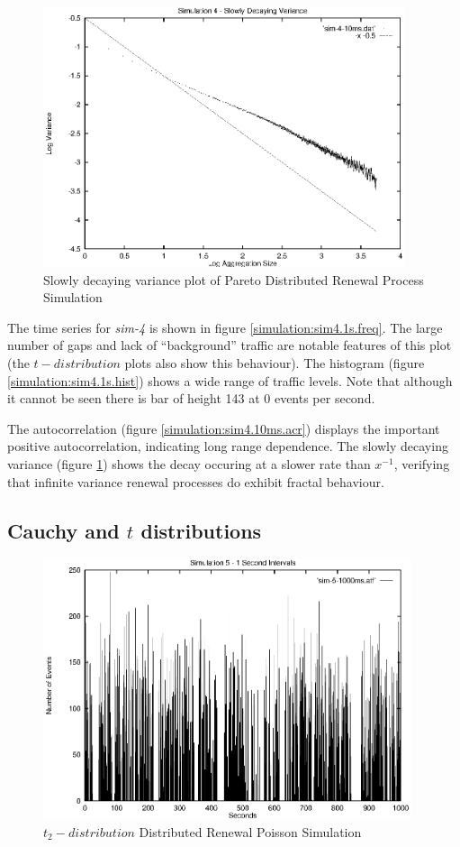 \begin{figure}
\includegraphics[height=3in]{pics/sim-4-10ms-sta.eps}
\caption{Slowly decaying variance plot of Pareto Distributed Renewal Process Simulation}
\label{simulation:sim4.10ms.sta}
\end{figure}

The time series for \emph{sim-4} is shown in figure
\ref{simulation:sim4.1s.freq}.  The large number of gaps and lack of
``background'' traffic are notable features of this plot (the
$t-distribution$ plots also show this behaviour).  The histogram
(figure \ref{simulation:sim4.1s.hist}) shows a wide range of traffic
levels.  Note that although it cannot be seen there is bar of height
143 at 0 events per second.

The autocorrelation (figure \ref{simulation:sim4.10ms.acr}) displays
the important positive autocorrelation, indicating long range
dependence.  The slowly decaying variance (figure
\ref{simulation:sim4.10ms.sta}) shows the decay occuring at a slower
rate than $x^{-1}$, verifying that infinite variance renewal processes
do exhibit fractal behaviour.

\subsection{Cauchy and $t$ distributions}

\begin{figure}[h]
\includegraphics[height=3in]{pics/sim-5-1s-freq.eps}
\caption{$t_2-distribution$ Distributed Renewal Poisson Simulation}
\label{simulation:sim5.1s.freq}
\end{figure}

